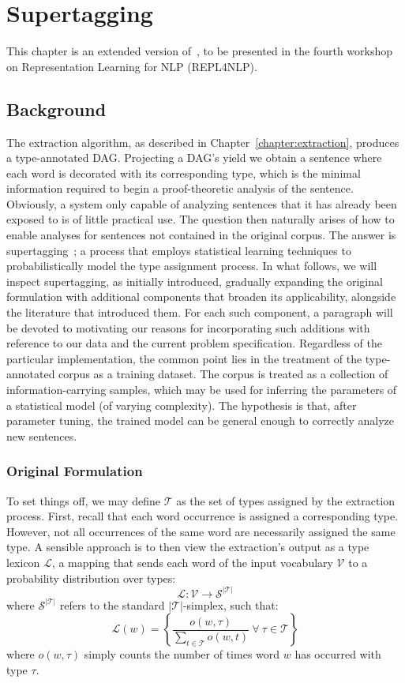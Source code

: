 \chapter{Supertagging}
\label{chapter:sup}
This chapter is an extended version of~\cite{constructive}, to be presented in the fourth workshop on Representation Learning for NLP (REPL4NLP).

\section{Background}
The extraction algorithm, as described in Chapter~\ref{chapter:extraction}, produces a type-annotated DAG.
Projecting a DAG's yield we obtain a sentence where each word is decorated with its corresponding type, which is the minimal information required to begin a proof-theoretic analysis of the sentence.
Obviously, a system only capable of analyzing sentences that it has already been exposed to is of little practical use.
The question then naturally arises of how to enable analyses for sentences not contained in the original corpus.
The answer is supertagging~\cite{supertagging}; a process that employs statistical learning techniques to probabilistically model the type assignment process.
In what follows, we will inspect supertagging, as initially introduced, gradually expanding the original formulation with additional components that broaden its applicability, alongside the literature that introduced them. 
For each such component, a paragraph will be devoted to motivating our reasons for incorporating such additions with reference to our data and the current problem specification.
Regardless of the particular implementation, the common point lies in the treatment of the type-annotated corpus as a training dataset. 
The corpus is treated as a collection of information-carrying samples, which may be used for inferring the parameters of a statistical model (of varying complexity).
The hypothesis is that, after parameter tuning, the trained model can be general enough to correctly analyze new sentences.

\subsection{Original Formulation}
To set things off, we may define $\mathcal{T}$ as the set of types assigned by the extraction process.
First, recall that each word occurrence is assigned a corresponding type.
However, not all occurrences of the same word are necessarily assigned the same type.
A sensible approach is to then view the extraction's output as a type lexicon $\mathcal L$, a mapping that sends each word of the input vocabulary $\mathcal{V}$ to a probability distribution over types:
\[
\mathcal{L}: \mathcal{V} \to \mathcal{S}^{|\mathcal{T}|}
\]
where $\mathcal{S}^{|\mathcal{T}|}$ refers to the standard $|\mathcal{T}|$-simplex, such that:
\[
\mathcal{L}(w) = \left \{ \frac{o(w, \tau)}{\sum_{t \in \mathcal{T}}{o(w, t)}} \ \forall \ \tau \in \mathcal{T} \right \} 
\]
where $o(w, \tau)$ simply counts the number of times word $w$ has occurred with type $\tau$.

